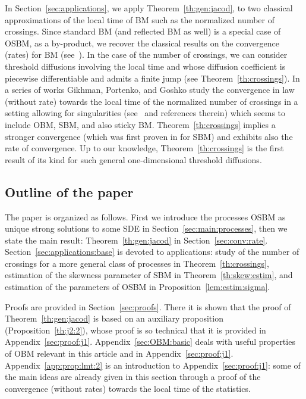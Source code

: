 \documentclass[12pt]{article}
\numberwithin{equation}{section}
\theoremstyle{definition}
\theoremstyle{remark}
\begin{document}
In Section~\ref{sec:applications}, we apply Theorem~\ref{th:gen:jacod}, to two classical approximations of the local time of BM such as the normalized number of crossings.
Since standard BM (and reflected BM as well) is a special case of OSBM, as a by-product, we recover the classical results on the convergence (rates) for BM (see~\cite{borodin89,j1}).
In the case of the number of crossings,  
we can %
consider
threshold diffusions 
involving the local time and 
whose diffusion coefficient is piecewise differentiable and admits a finite jump 
(see Theorem~\ref{th:crossings}).
In a series of works Gikhman, Portenko, and Goshko study the convergence in law (without rate) 
towards the local time of the normalized number of crossings in a setting allowing for singularities (see~\cite{port1} and references therein) which seems to include OBM, SBM, and also sticky BM. 
Theorem~\ref{th:crossings} implies a stronger convergence (which was first proven in \cite{lmt1} for SBM) and exhibits also the rate of convergence. Up to our knowledge, Theorem~\ref{th:crossings} is the first result of its kind for such general one-dimensional threshold diffusions.





\subsection{Outline of the paper}
The paper is organized as follows.
First we introduce the processes OSBM as unique strong solutions to some SDE in Section~\ref{sec:main:processes}, 
then %
we state the main result: 
Theorem~\ref{th:gen:jacod} 
in Section~\ref{sec:conv:rate}. %
% 
Section~\ref{sec:applications:base}
is devoted to applications: 
study of the number of crossings for a more general class of processes in Theorem~\ref{th:crossings}, estimation of the skewness parameter of SBM in Theorem~\ref{th:skew:estim}, and estimation of the parameters of OSBM in Proposition~\ref{lem:estim:sigma}.

Proofs are provided in Section~\ref{sec:proofs}. 
%
There it is shown that the proof of Theorem~\ref{th:gen:jacod} is based on an auxiliary proposition (Proposition~\ref{th:j2:2}), 
whose proof is so technical that it is provided in Appendix~\ref{sec:proof:j1}.
Appendix~\ref{sec:OBM:basic} deals with useful properties of OBM relevant in this article and in Appendix~\ref{sec:proof:j1}.
Appendix~\ref{app:prop:lmt:2} is an introduction to Appendix~\ref{sec:proof:j1}: some of the main ideas are already given in this section through a proof of the convergence (without rates) towards the local time of the statistics.
\end{document}
